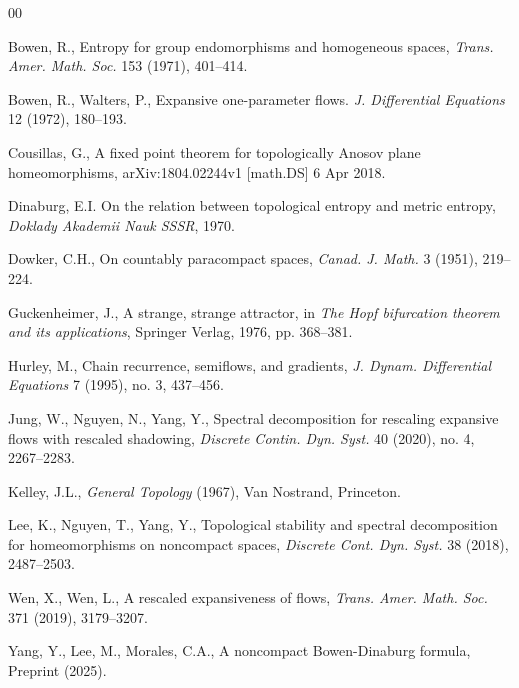 \documentclass[11pt,letterpaper]{amsart}
\begin{document}
\begin{thebibliography}{00}


Bowen, R.,
Entropy for group endomorphisms and homogeneous spaces,
{\em Trans. Amer. Math. Soc.} 153 (1971), 401--414.



Bowen, R., Walters, P.,
Expansive one-parameter flows.
{\em J. Differential Equations} 12 (1972), 180--193.


Cousillas, G.,
A fixed point theorem for topologically Anosov plane homeomorphisms,
arXiv:1804.02244v1 [math.DS] 6 Apr 2018.



Dinaburg, E.I.
On the relation between topological entropy and metric entropy,
\textit{Doklady Akademii Nauk SSSR}, 1970.



Dowker, C.H.,
On countably paracompact spaces,
{\em Canad. J. Math.} 3 (1951), 219--224.



Guckenheimer, J.,
A strange, strange attractor,
in {\em The Hopf bifurcation theorem and its applications}, Springer Verlag, 1976, pp. 368--381.


Hurley, M.,
Chain recurrence, semiflows, and gradients,
{\em J. Dynam. Differential Equations} 7 (1995), no. 3, 437--456.


Jung, W., Nguyen, N., Yang, Y.,
Spectral decomposition for rescaling expansive flows with rescaled shadowing,
{\em Discrete Contin. Dyn. Syst.} 40 (2020), no. 4, 2267--2283.


Kelley, J.L.,
{\em General Topology} (1967), Van Nostrand, Princeton.


Lee, K., Nguyen, T., Yang, Y.,
Topological stability and spectral decomposition for homeomorphisms on noncompact spaces,
{\em Discrete Cont. Dyn. Syst.} 38 (2018), 2487--2503.


Wen, X., Wen, L.,
A rescaled expansiveness of flows,
{\em Trans. Amer. Math. Soc.} 371 (2019), 3179--3207.




Yang, Y., Lee, M., Morales, C.A.,
A noncompact Bowen-Dinaburg formula,
Preprint (2025).


\end{thebibliography}
\end{document}
